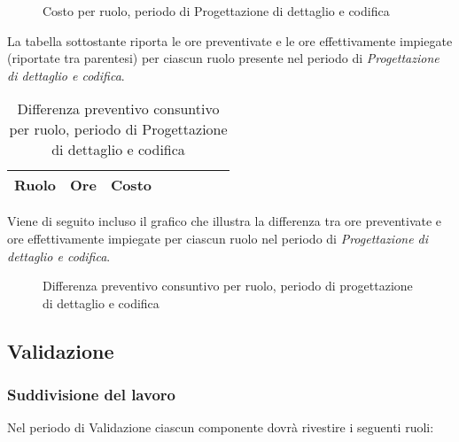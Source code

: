 	\begin{figure}[H]
	\begin{tikzpicture}
		
	\end{tikzpicture}
	\caption{Costo per ruolo, periodo di Progettazione di dettaglio e codifica}
	\end{figure}

	La tabella sottostante riporta le ore preventivate e le ore effettivamente impiegate (riportate tra parentesi) per ciascun ruolo presente nel periodo di \textit{Progettazione di dettaglio e codifica}.

	\begin{table}[H]
	\centering
	\begin{tabular}{lccccccc}
	\toprule
	    \textbf{Ruolo}  & \textbf{Ore} & \textbf{Costo} \\
	    \midrule
	    
	    \bottomrule
	\end{tabular}
	\caption{Differenza preventivo consuntivo per ruolo, periodo di Progettazione di dettaglio e codifica}
	\end{table}

	Viene di seguito incluso il grafico che illustra la differenza tra ore preventivate e ore effettivamente impiegate per ciascun ruolo nel periodo di \textit{Progettazione di dettaglio e codifica}.

	\begin{figure}[H]
	\centering
	\caption{Differenza preventivo consuntivo per ruolo, periodo di progettazione di dettaglio e codifica}
	\end{figure}


\pagebreak
\subsection{Validazione}

	
	\subsubsection{Suddivisione del lavoro}

	Nel periodo di Validazione ciascun componente dovrà rivestire i seguenti ruoli:

